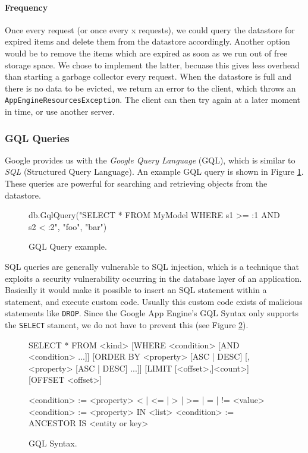 \paragraph{Frequency}
Once every request (or once every x requests), we could query the datastore for
expired items and delete them from the datastore accordingly. Another option
would be to remove the items which are expired as soon as we run out of free
storage space. We chose to implement the latter, becuase this gives less
overhead than starting a garbage collector every request. When the datastore is
full and there is no data to be evicted, we return an error to the client, which
throws an \texttt{AppEngineResourcesException}. The client can then try again at
a later moment in time, or use another server.

\subsubsection{GQL Queries}
Google provides us with the \emph{Google Query Language} (GQL), which is similar
to \emph{SQL} (Structured Query Language). An example GQL query is shown in
Figure \ref{serverdesign-gql-example}. These queries are powerful for searching and
retrieving objects from the datastore. 

\begin{figure}[ht] %
\begin{center}
\begin{code}
db.GqlQuery("SELECT * FROM MyModel WHERE s1 >= :1 AND s2 < :2", "foo", "bar")
\end{code}
\caption{GQL Query example.\label{serverdesign-gql-example}}
\end{center}
\end{figure}

SQL queries are generally vulnerable to SQL injection,
which is a technique that exploits a security vulnerability occurring in the
database layer of an application. Basically it would make it possible to insert
an SQL statement within a statement, and execute custom code. Usually this
custom code exists of malicious statements like \texttt{DROP}. Since the Google
App Engine's GQL Syntax only supports the \texttt{SELECT} stament, we do not
have to prevent this (see Figure \ref{serverdesign-gql-syntax}).

\begin{figure}[ht] %
\begin{center}
\begin{code}
  SELECT * FROM <kind>
    [WHERE <condition> [AND <condition> ...]]
    [ORDER BY <property> [ASC | DESC] [, <property> [ASC | DESC] ...]]
    [LIMIT [<offset>,]<count>]
    [OFFSET <offset>]

  <condition> := <property> {< | <= | > | >= | = | != } <value>
  <condition> := <property> IN <list>
  <condition> := ANCESTOR IS <entity or key>
\end{code}
\caption{GQL Syntax.\label{serverdesign-gql-syntax}}
\end{center}
\end{figure}

